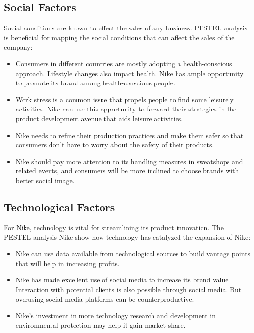 \documentclass[a4paper, 12pt]{report}
\begin{document}
\subsection{Social Factors}
Social conditions are known to affect the sales of any business. PESTEL analysis is beneficial for mapping the social conditions that can affect the sales of the company:
\begin{itemize}
    \item Consumers in different countries are mostly adopting a health-conscious approach. Lifestyle changes also impact health. Nike has ample opportunity to promote its brand among health-conscious people.
    \item Work stress is a common issue that propels people to find some leisurely activities. Nike can use this opportunity to forward their strategies in the product development avenue that aids leisure activities.
    \item Nike needs to refine their production practices and make them safer so that consumers don’t have to worry about the safety of their products.
    \item Nike should pay more attention to its handling measures in sweatshops and related events, and consumers will be more inclined to choose brands with better social image.
\end{itemize}
\subsection{Technological Factors}
For Nike, technology is vital for streamlining its product innovation. The PESTEL analysis Nike show how technology has catalyzed the expansion of Nike:
\begin{itemize}
    \item Nike can use data available from technological sources to build vantage points that will help in increasing profits.
    \item Nike has made excellent use of social media to increase its brand value. Interaction with potential clients is also possible through social media. But overusing social media platforms can be counterproductive.
    \item Nike's investment in more technology research and development in environmental protection may help it gain market share.
\end{itemize}
\end{document}
